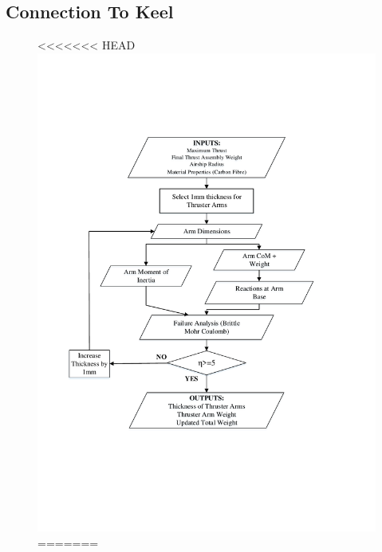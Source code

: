 \documentclass[../main.tex]{subfiles}
\begin{document}
\subsection{Connection To Keel} \label{connector}
\begin{figure}[H]
	\centering
<<<<<<< HEAD
	\includegraphics[width=.9\linewidth]{img/paramaterization/thrusterArms.pdf}
=======

\end{figure}
\end{document}
